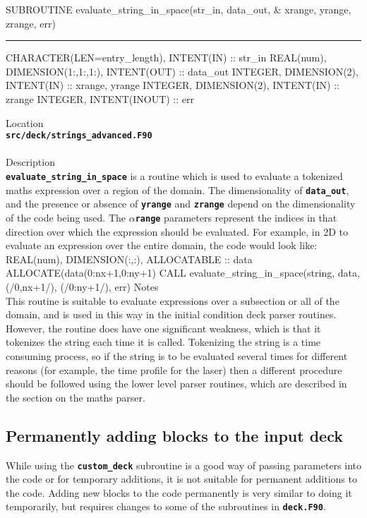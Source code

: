 \documentclass[12pt,a4paper]{article}
\newcommand{\HRule}{\rule[0.3cm]{\linewidth}{0.5mm}}
\newcommand{\inlinecode}[1]{{\color{warwickred} \bf\texttt{#1}}}
\newenvironment{boxverbatim}{\lboxverbatim{none}}{\endlboxverbatim}
\begin{document}
\pagebreak
\begin{codedef}
SUBROUTINE evaluate_string_in_space(str_in, data_out, &
    xrange, {yrange}, {zrange}, err)
\HRule
CHARACTER(LEN=entry_length), INTENT(IN) :: str_in
REAL(num), DIMENSION(1:,{1:},{1:}), INTENT(OUT) :: data_out
INTEGER, DIMENSION(2), INTENT(IN) :: xrange, {yrange}
INTEGER, DIMENSION(2), INTENT(IN) :: {zrange}
INTEGER, INTENT(INOUT) :: err
\end{codedef}
\vspace{1cm}
{\Large Location\\}
\inlinecode{src/deck/strings\_advanced.F90}\\
\\[0.5cm]
{\Large Description\\}
\inlinecode{evaluate\_string\_in\_space} is a routine which is used to evaluate
a tokenized maths expression over a region of the domain. The dimensionality of
\inlinecode{data\_out}, and the presence or absence of \inlinecode{yrange} and
\inlinecode{zrange} depend on the dimensionality of the code being used. The
\inlinecode{{\it $\alpha$}range} parameters represent the indices in that
direction over which the expression should be evaluated. For example, in 2D to
evaluate an expression over the entire domain, the code would look like:
\begin{boxverbatim}
REAL(num), DIMENSION(:,:), ALLOCATABLE :: data
ALLOCATE(data(0:nx+1,0:ny+1)
CALL evaluate_string_in_space(string, data, (/0,nx+1/), (/0:ny+1/), err)
\end{boxverbatim}
{\Large Notes\\}
This routine is suitable to evaluate expressions over a subsection or all of
the domain, and is used in this way in the initial condition deck parser
routines. However, the routine does have one significant weakness, which is
that it tokenizes the string each time it is called. Tokenizing the string is a
time consuming process, so if the string is to be evaluated several times for
different reasons (for example, the time profile for the laser) then a
different procedure should be followed using the lower level parser routines,
which are described in the section on the maths parser.
\pagebreak

\subsection{Permanently adding blocks to the input deck}

While using the \inlinecode{custom\_deck} subroutine is a good way of passing
parameters into the code or for temporary additions, it is not suitable for
permanent additions to the code. Adding new blocks to the code permanently is
very similar to doing it temporarily, but requires changes to some of the
subroutines in \inlinecode{deck.F90}.\\
\end{document}
